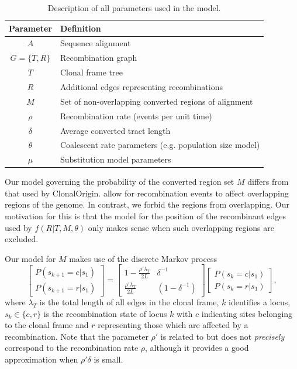 \documentclass[a4paper,10pt]{article}
\begin{document}
\begin{table}[t]
\begin{tabular}{|cl|}
  \hline
  Parameter & Definition \\
  \hline
  $A$ & Sequence alignment \\
  $G=\{T,R\}$ & Recombination graph \\
  $T$ & Clonal frame tree \\
  $R$ & Additional edges representing recombinations \\
  $M$ & Set of non-overlapping converted regions of alignment \\
  $\rho$ & Recombination rate (events per unit time) \\
  $\delta$ & Average converted tract length \\
  $\theta$ & Coalescent rate parameters (e.g. population size model) \\
  $\mu$ & Substitution model parameters \\
  \hline
\end{tabular}
\caption{Description of all parameters used in the model.}
\end{table}


Our model governing the probability of the converted region set $M$
differs from that used by ClonalOrigin. \cite{Didelot2010} allow for
recombination events to affect overlapping regions of the genome.  In
contrast, we forbid the regions from overlapping. Our motivation for
this is that the model for the position of the recombinant edges used
by $f(R|T,M,\theta)$ only makes sense when such overlapping regions
are excluded.

Our model for $M$ makes use of the discrete Markov process
\begin{equation}
\begin{bmatrix}
P(s_{k+1}=c|s_1) \\
P(s_{k+1}=r|s_1)
\end{bmatrix}
=
\begin{bmatrix}
1-\frac{\rho' \lambda_T}{2L} & \delta^{-1} \\
\frac{\rho' \lambda_T}{2L} & (1-\delta^{-1})
\end{bmatrix}
\begin{bmatrix}
P(s_{k}=c|s_1) \\
P(s_{k}=r|s_1)
\end{bmatrix},
\end{equation}
where $\lambda_T$ is the total length of all edges in the clonal
frame, $k$ identifies a locus, $s_k\in\{c,r\}$ is the recombination
state of locus $k$ with $c$ indicating sites belonging to the clonal
frame and $r$ representing those which are affected by a
recombination.  Note that the parameter $\rho'$ is related to but does
not \emph{precisely} correspond to the recombination rate $\rho$,
although it provides a good approximation when $\rho'\delta$ is small.
\end{document}

